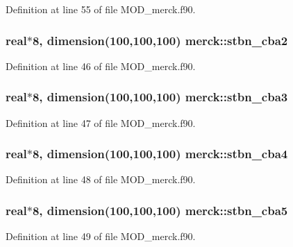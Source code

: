 Definition at line 55 of file M\-O\-D\-\_\-merck.\-f90.

\hypertarget{classmerck_a8ce0bd0a66cc17246fd5b41f993a3ffb}{
\subsubsection[{stbn\-\_\-cba2}]{\setlength{\rightskip}{0pt plus 5cm}real$\ast$8, dimension(100,100,100) merck\-::stbn\-\_\-cba2}}\label{classmerck_a8ce0bd0a66cc17246fd5b41f993a3ffb}


Definition at line 46 of file M\-O\-D\-\_\-merck.\-f90.

\hypertarget{classmerck_a622e2393fd9bd1a8832e51ecdc90ed01}{
\subsubsection[{stbn\-\_\-cba3}]{\setlength{\rightskip}{0pt plus 5cm}real$\ast$8, dimension(100,100,100) merck\-::stbn\-\_\-cba3}}\label{classmerck_a622e2393fd9bd1a8832e51ecdc90ed01}


Definition at line 47 of file M\-O\-D\-\_\-merck.\-f90.

\hypertarget{classmerck_a0a003faf5f47dd975b8f0799de808088}{
\subsubsection[{stbn\-\_\-cba4}]{\setlength{\rightskip}{0pt plus 5cm}real$\ast$8, dimension(100,100,100) merck\-::stbn\-\_\-cba4}}\label{classmerck_a0a003faf5f47dd975b8f0799de808088}


Definition at line 48 of file M\-O\-D\-\_\-merck.\-f90.

\hypertarget{classmerck_aff2385fd8c779536ba4916db21315237}{
\subsubsection[{stbn\-\_\-cba5}]{\setlength{\rightskip}{0pt plus 5cm}real$\ast$8, dimension(100,100,100) merck\-::stbn\-\_\-cba5}}\label{classmerck_aff2385fd8c779536ba4916db21315237}


Definition at line 49 of file M\-O\-D\-\_\-merck.\-f90.

